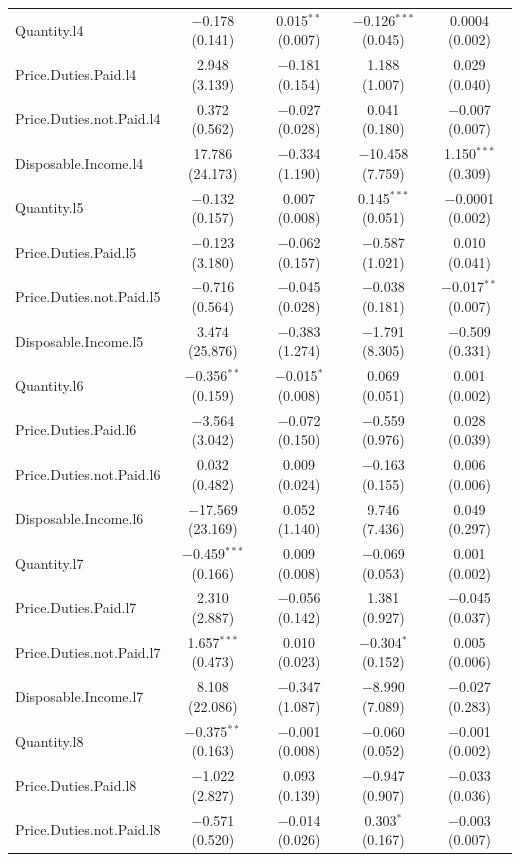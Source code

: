 \documentclass[11pt,preprint, authoryear]{elsarticle}
\let\origtable\table
\let\endorigtable\endtable
\renewenvironment{table}[1][2] {
    \expandafter\origtable\expandafter[H]
} {
    \endorigtable
}
\numberwithin{equation}{section}
\numberwithin{figure}{section}
\numberwithin{table}{section}
\begin{document}
\begin{table}[!htbp]
\begin{tabular}{@{\extracolsep{1pt}}lcccc}
  Quantity.l4 & $-$0.178 (0.141) & 0.015$^{**}$ (0.007) & $-$0.126$^{***}$ (0.045) & 0.0004 (0.002) \\ 
  Price.Duties.Paid.l4 & 2.948 (3.139) & $-$0.181 (0.154) & 1.188 (1.007) & 0.029 (0.040) \\ 
  Price.Duties.not.Paid.l4 & 0.372 (0.562) & $-$0.027 (0.028) & 0.041 (0.180) & $-$0.007 (0.007) \\ 
  Disposable.Income.l4 & 17.786 (24.173) & $-$0.334 (1.190) & $-$10.458 (7.759) & 1.150$^{***}$ (0.309) \\ 
  Quantity.l5 & $-$0.132 (0.157) & 0.007 (0.008) & 0.145$^{***}$ (0.051) & $-$0.0001 (0.002) \\ 
  Price.Duties.Paid.l5 & $-$0.123 (3.180) & $-$0.062 (0.157) & $-$0.587 (1.021) & 0.010 (0.041) \\ 
  Price.Duties.not.Paid.l5 & $-$0.716 (0.564) & $-$0.045 (0.028) & $-$0.038 (0.181) & $-$0.017$^{**}$ (0.007) \\ 
  Disposable.Income.l5 & 3.474 (25.876) & $-$0.383 (1.274) & $-$1.791 (8.305) & $-$0.509 (0.331) \\ 
  Quantity.l6 & $-$0.356$^{**}$ (0.159) & $-$0.015$^{*}$ (0.008) & 0.069 (0.051) & 0.001 (0.002) \\ 
  Price.Duties.Paid.l6 & $-$3.564 (3.042) & $-$0.072 (0.150) & $-$0.559 (0.976) & 0.028 (0.039) \\ 
  Price.Duties.not.Paid.l6 & 0.032 (0.482) & 0.009 (0.024) & $-$0.163 (0.155) & 0.006 (0.006) \\ 
  Disposable.Income.l6 & $-$17.569 (23.169) & 0.052 (1.140) & 9.746 (7.436) & 0.049 (0.297) \\ 
  Quantity.l7 & $-$0.459$^{***}$ (0.166) & 0.009 (0.008) & $-$0.069 (0.053) & 0.001 (0.002) \\ 
  Price.Duties.Paid.l7 & 2.310 (2.887) & $-$0.056 (0.142) & 1.381 (0.927) & $-$0.045 (0.037) \\ 
  Price.Duties.not.Paid.l7 & 1.657$^{***}$ (0.473) & 0.010 (0.023) & $-$0.304$^{*}$ (0.152) & 0.005 (0.006) \\ 
  Disposable.Income.l7 & 8.108 (22.086) & $-$0.347 (1.087) & $-$8.990 (7.089) & $-$0.027 (0.283) \\ 
  Quantity.l8 & $-$0.375$^{**}$ (0.163) & $-$0.001 (0.008) & $-$0.060 (0.052) & $-$0.001 (0.002) \\ 
  Price.Duties.Paid.l8 & $-$1.022 (2.827) & 0.093 (0.139) & $-$0.947 (0.907) & $-$0.033 (0.036) \\ 
  Price.Duties.not.Paid.l8 & $-$0.571 (0.520) & $-$0.014 (0.026) & 0.303$^{*}$ (0.167) & $-$0.003 (0.007) \\ 

\end{tabular}
\end{table}
\end{document}
